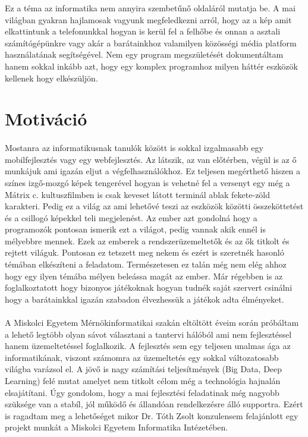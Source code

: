 Ez a téma az informatika nem annyira szembetűnő oldaláról mutatja be. 
A mai világban gyakran hajlamosak vagyunk megfeledkezni arról, hogy az a kép amit elkattintunk a telefonunkkal hogyan is kerül fel a felhőbe és onnan a asztali számítógépünkre vagy akár a barátainkhoz valamilyen közösségi média platform használatának segítségével.
Nem egy program megszületését dokumentáltam hanem sokkal inkább azt, hogy egy komplex programhoz milyen háttér eszközök kellenek hogy elkészüljön.
\pagebreak
\section{Motiváció}

\paragraph{}
Mostanra az informatikusnak tanulók között is sokkal izgalmasabb egy mobilfejlesztés vagy egy webfejlesztés.
Az látszik, az van előtérben, végül is az ő munkájuk ami igazán eljut a végfelhasználókhoz.
Ez teljesen megérthető hiszen a színes izgő-mozgó képek tengerével hogyan is vehetné fel a versenyt egy még a Mátrix c. kultuszfilmben is csak keveset látott terminál ablak fekete-zöld karakteri.
Pedig ez a világ az ami lehetővé teszi az eszközök közötti összeköttetést és a csillogó képekkel teli megjelenést.
Az ember azt gondolná hogy a programozók pontosan ismerik ezt a világot, pedig vannak akik ennél is mélyebbre mennek.
Ezek az emberek a rendszerüzemeltetők és az ők titkolt és rejtett világuk.
Pontosan ez tetszett meg nekem és ezért is szeretnék hasonló témában elkészíteni a feladatom.
Természetesen ez talán még nem elég ahhoz hogy egy ilyen témába mélyen beleássa  magát az ember.
Már régebben is az foglalkoztatott hogy bizonyos játékoknak hogyan tudnék saját szervert csinálni hogy a barátainkkal igazán szabadon élvezhessük a játékok adta élményeket.

\paragraph{}
A Miskolci Egyetem Mérnökinformatikai szakán eltöltött éveim során próbáltam a lehető legtöbb olyan sávot választani a tantervi hálóból ami nem fejlesztéssel hanem üzemeltetéssel foglalkozik. 
A fejlesztés sem egy teljesen unalmas ága az informatikának, viszont számomra az üzemeltetés egy sokkal változatosabb világba varázsol el.
A jövő is nagy számítási teljesítmények (Big Data, Deep Learning) felé mutat amelyet nem titkolt célom még a technológia hajnalán elsajátítani. 
Úgy gondolom, hogy a mai fejlesztési feladatinak még nagyobb szüksége van a stabíl, jól működő és állandóan rendelkezésre álló supportra. 
Ezért is ragadtam meg a lehetőséget mikor Dr. Tóth Zsolt konzulensem felajánlott egy projekt munkát a Miskolci Egyetem Informatika Intézetében. 

